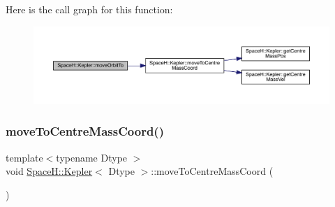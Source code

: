 Here is the call graph for this function\+:
\nopagebreak
\begin{figure}[H]
\begin{center}
\leavevmode
\includegraphics[width=350pt]{struct_space_h_1_1_kepler_a2a2595d386eca7c9dda35a2a4da1114f_cgraph}
\end{center}
\end{figure}
\mbox{\label{struct_space_h_1_1_kepler_a695ab24623b4bd6dbcba8fc388090ace}} 
\subsubsection{\texorpdfstring{move\+To\+Centre\+Mass\+Coord()}{moveToCentreMassCoord()}}
{\footnotesize\ttfamily template$<$typename Dtype $>$ \\
void \mbox{\hyperlink{struct_space_h_1_1_kepler}{Space\+H\+::\+Kepler}}$<$ Dtype $>$\+::move\+To\+Centre\+Mass\+Coord (\begin{DoxyParamCaption}{ }\end{DoxyParamCaption})\hspace{0.3cm}{\ttfamily [inline]}}

